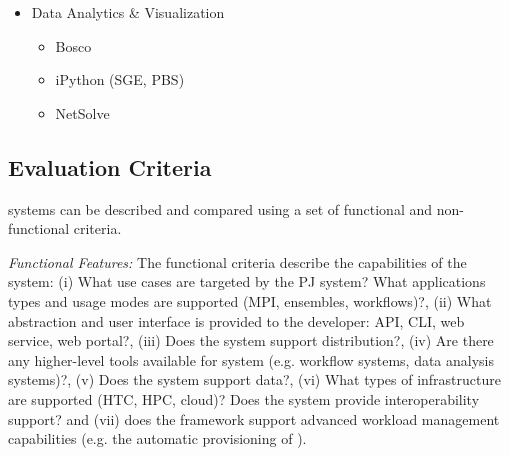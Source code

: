 \documentclass{sig-alternate}
\begin{document}
\begin{itemize}
	\item Data Analytics \& Visualization
	\begin{itemize}
		\item Bosco
		\item iPython (SGE, PBS)
		\item NetSolve~\cite{Casanova:1995:NNS:898848}
	\end{itemize}		
\end{itemize}


\subsection{Evaluation Criteria}\label{ssec:evaluation}



\pilotjob systems can be described and compared using a set of 
functional and non-functional criteria. 

\emph{Functional Features:} The functional criteria describe the
capabilities of the \pilotjob system: (i) What use cases are targeted
by the PJ system? What applications types and usage modes are
supported (MPI, ensembles, workflows)?, (ii) What abstraction and user
interface is provided to the developer: API, CLI, web service, web
portal?, (iii) Does the \pilotjob system support distribution?, (iv)
Are there any higher-level tools available for \pilotjob system
(e.g. workflow systems, data analysis systems)?, (v) Does the
\pilotjob system support data?, (vi) What types of infrastructure are
supported (HTC, HPC, cloud)? Does the \pilotjob system provide
interoperability support? and (vii) does the framework support
advanced workload management capabilities (e.g. the automatic
provisioning of \pilots).
\end{document}
